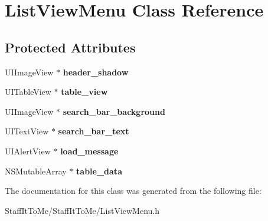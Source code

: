 \hypertarget{interface_list_view_menu}{
\section{\-List\-View\-Menu \-Class \-Reference}
\label{interface_list_view_menu}
}
\subsection*{\-Protected \-Attributes}
\begin{DoxyCompactItemize}
\item 
\hypertarget{interface_list_view_menu_a0efdd27f68646a7479f90e45207cff18}{
\-U\-I\-Image\-View $\ast$ {\bfseries header\-\_\-shadow}}
\label{interface_list_view_menu_a0efdd27f68646a7479f90e45207cff18}

\item 
\hypertarget{interface_list_view_menu_ace1d0c34c5ef1ec0441570a8d96376d0}{
\-U\-I\-Table\-View $\ast$ {\bfseries table\-\_\-view}}
\label{interface_list_view_menu_ace1d0c34c5ef1ec0441570a8d96376d0}

\item 
\hypertarget{interface_list_view_menu_af4ffd53531ae2eb3ebcfca2dc10c4b82}{
\-U\-I\-Image\-View $\ast$ {\bfseries search\-\_\-bar\-\_\-background}}
\label{interface_list_view_menu_af4ffd53531ae2eb3ebcfca2dc10c4b82}

\item 
\hypertarget{interface_list_view_menu_ac4e9d588db1b6c7635fef505ec5e14b4}{
\-U\-I\-Text\-View $\ast$ {\bfseries search\-\_\-bar\-\_\-text}}
\label{interface_list_view_menu_ac4e9d588db1b6c7635fef505ec5e14b4}

\item 
\hypertarget{interface_list_view_menu_aa896dbc88d5d3de09462f48e88e74b35}{
\-U\-I\-Alert\-View $\ast$ {\bfseries load\-\_\-message}}
\label{interface_list_view_menu_aa896dbc88d5d3de09462f48e88e74b35}

\item 
\hypertarget{interface_list_view_menu_a66eed3e74f13049cd7bf956eec4dcecd}{
\-N\-S\-Mutable\-Array $\ast$ {\bfseries table\-\_\-data}}
\label{interface_list_view_menu_a66eed3e74f13049cd7bf956eec4dcecd}

\end{DoxyCompactItemize}


\-The documentation for this class was generated from the following file\-:\begin{DoxyCompactItemize}
\item 
\-Staff\-It\-To\-Me/\-Staff\-It\-To\-Me/\-List\-View\-Menu.\-h\end{DoxyCompactItemize}
